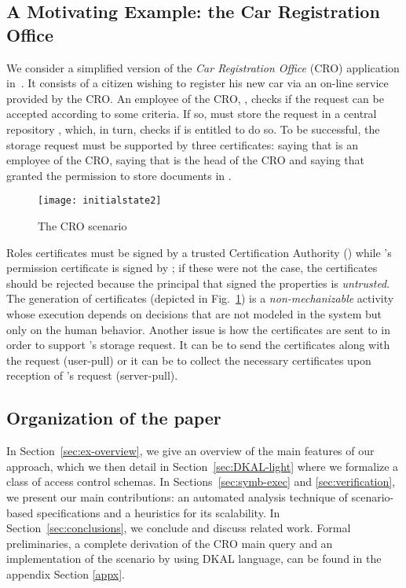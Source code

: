 \documentclass[conference]{llncs}
\newcommand{\CRO}{CRO}
\begin{document}
\subsection{A Motivating Example: the Car Registration Office} 
\label{sec:runningexe}

We consider a simplified version of the
\emph{Car Registration Office} (\CRO{}) application in~\cite{BRV-TR09}.
It consists of a citizen wishing
to register his new car via an on-line service provided by the \CRO{}.  
An employee of the \CRO{}, , checks if the request can be accepted according to
some criteria. If so,  must store the request in a central
repository , which, in turn,
checks if  is entitled to do so. 
To be successful, the storage request must be supported by three certificates:  saying
that  is an employee of the \CRO{},  saying that  is the head of the \CRO{} and  saying that  granted  the permission to store documents
in . 
\begin{figure}[t]
\centering
  \texttt{[image: initialstate2]}
  \caption{\label{fig:1}The \CRO{} scenario} 
\end{figure}
Roles certificates must be signed by a
trusted Certification Authority () while 's
permission certificate is signed by ; if these were not the case, the
certificates should be rejected because the principal that signed the
properties is \emph{untrusted}. The generation of certificates
(depicted in Fig.~\ref{fig:1}) is a \emph{non-mechanizable} activity
whose execution depends on decisions that are not modeled in the
system but only on the human behavior.  Another issue is how the
certificates are sent to  in order to support 's storage
request.  It can be  to send the certificates along with the
request (user-pull) or it can be  to collect the necessary
certificates upon reception of 's request (server-pull).

\subsection*{Organization of the paper} 
In Section~\ref{sec:ex-overview}, we give an
overview of the main features of our approach, which we then detail in
Section~\ref{sec:DKAL-light} where we
formalize a class of access control schemas.  In Sections~\ref{sec:symb-exec} and \ref{sec:verification}, we present our main contributions: an automated analysis technique of scenario-based specifications and a heuristics for its scalability.
In Section~\ref{sec:conclusions}, we conclude and discuss related  work.
Formal preliminaries, a complete derivation of the \CRO{} main query and an implementation of the scenario by using DKAL language, can be found in the appendix Section \ref{appx}.
\end{document}
